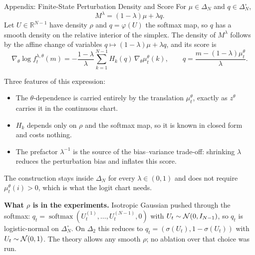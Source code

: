 \documentclass[9pt]{beamer}
\def\Nc{{\cal N}}
\def\R{{\mathbb R}}
\begin{document}
\begin{frame}{Appendix: Finite-State Perturbation Density and Score}
\small
For $\mu\in\Delta_N$ and $q\in\Delta_N^\circ$,
\[
  M^\lambda=(1-\lambda)\mu+\lambda q .
\]
Let $U\in\R^{N-1}$ have density $\rho$ and $q=\varphi(U)$ the softmax map, so $q$ has a smooth density on the relative interior of the simplex. The density of $M^\lambda$ follows by the affine change of variables $q\mapsto(1-\lambda)\mu+\lambda q$, and its score is
\[
  \nabla_\theta\log f_t^{\lambda,\theta}(m)
  =
  -\frac{1-\lambda}{\lambda}
  \sum_{k=1}^{N-1}H_k(q)\,\nabla_\theta\mu_t^\theta(k),
  \qquad
  q=\frac{m-(1-\lambda)\mu_t^\theta}{\lambda}.
\]

\vspace{0.15cm}
Three features of this expression:
\begin{itemize}
  \item The $\theta$-dependence is carried entirely by the translation $\mu_t^\theta$, exactly as $z^\theta$ carries it in the continuous chart.
  \item $H_k$ depends only on $\rho$ and the softmax map, so it is known in closed form and costs nothing.
  \item The prefactor $\lambda^{-1}$ is the source of the bias--variance trade-off: shrinking $\lambda$ reduces the perturbation bias and inflates this score.
\end{itemize}

\vspace{0.15cm}
The construction stays inside $\Delta_N$ for every $\lambda\in(0,1)$ and does not require $\mu_t^\theta(i)>0$, which is what the logit chart needs.

\vspace{0.15cm}
\scriptsize
\textbf{What $\rho$ is in the experiments.} Isotropic Gaussian pushed through the softmax: $q_t=\operatorname{softmax}(U_t^{(1)},\ldots,U_t^{(N-1)},0)$ with $U_t\sim\Nc(0,I_{N-1})$, so $q_t$ is logistic-normal on $\Delta_N^\circ$. On $\Delta_2$ this reduces to $q_t=(\sigma(U_t),1-\sigma(U_t))$ with $U_t\sim\Nc(0,1)$. The theory allows any smooth $\rho$; no ablation over that choice was run.
\end{frame}
\end{document}
